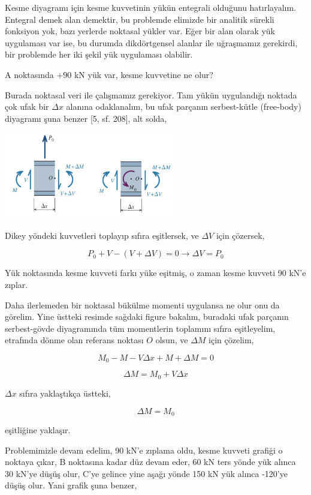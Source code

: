 \documentclass[12pt,fleqn]{article}\usepackage{../../common}
\begin{document}
Kesme diyagramı için kesme kuvvetinin yükün entegrali olduğunu hatırlayalım.
Entegral demek alan demektir, bu problemde elimizde bir analitik sürekli
fonksiyon yok, bazı yerlerde noktasal yükler var. Eğer bir alan olarak yük
uygulaması var ise, bu durumda dikdörtgensel alanlar ile uğraşmamız gerekirdi,
bir problemde her iki şekil yük uygulaması olabilir. 

A noktasında +90 kN yük var, kesme kuvvetine ne olur? 

Burada noktasal veri ile çalışmamız gerekiyor. Tam yükün uygulandığı noktada çok
ufak bir $\Delta x$ alanına odaklanalım, bu ufak parçanın serbest-kütle
(free-body) diyagramı şuna benzer [5, sf. 208], alt solda,

\includegraphics[width=20em]{phy_020_strs_02_16.jpg}

Dikey yöndeki kuvvetleri toplayıp sıfıra eşitlersek, ve $\Delta V$ için
çözersek,

$$
P_0 + V - (V + \Delta V) = 0 \to \Delta V = P_0
$$

Yük noktasında kesme kuvveti farkı yüke eşitmiş, o zaman kesme kuvveti 90 kN'e
zıplar.

Daha ilerlemeden bir noktasal bükülme momenti uygulansa ne olur onu da
görelim. Yine üstteki resimde sağdaki figure bakalım, buradaki ufak parçanın
serbest-gövde diyagramında tüm momentlerin toplamını sıfıra eşitleyelim,
etrafında dönme olan referans noktası $O$ olsun, ve $\Delta M$ için çözelim,

$$
M_0 -M - V \Delta x + M + \Delta M = 0 
$$

$$
\Delta M = M_0 + V \Delta x
$$

$\Delta x$ sıfıra yaklaştıkça üstteki,

$$
\Delta M = M_0
$$

eşitliğine yaklaşır.

Problemimizle devam edelim, 90 kN'e zıplama oldu, kesme kuvveti grafiği o
noktaya çıkar, B noktasına kadar düz devam eder, 60 kN ters yönde yük alınca 30
kN'ye düşüş olur, C'ye gelince yine aşağı yönde 150 kN yük alınca -120'ye düşüş
olur. Yani grafik şuna benzer,
\end{document}
